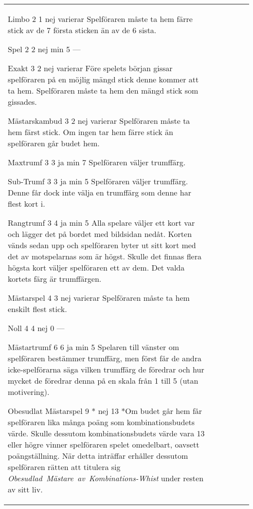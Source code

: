 \begin{table}
\begin{center}
\begin{tabularx}{\textwidth}{
			l
			S[table-number-alignment=center, table-format=1.0]
			S[table-number-alignment=center, table-format=1.0]
			cc|X
		}
				\standardBidItem%
				{Limbo}
				{2}
				{1}
				{nej}
				{varierar}
				{%
					Spelföraren måste ta hem färre stick av de 7 första sticken än av de 6 sista.
				}
				
				\standardBidItem%
				{Spel}
				{2}
				{2}
				{nej}
				{min 5}
				{%
					---
				}

				\standardBidItem%
				{Exakt}
				{3}
				{2}
				{nej}
				{varierar}
				{%
					Före spelets början gissar spelföraren på en möjlig mängd stick denne kommer att ta hem. Spelföraren måste ta hem den mängd stick som gissades.
				}

				\standardBidItem%
				{Mästarskambud}
				{3}
				{2}
				{nej}
				{varierar}
				{%
					Spelföraren måste ta hem färst stick. Om ingen tar hem färre stick än spelföraren går budet hem.
				}

				\standardBidItem%
				{Maxtrumf}
				{3}
				{3}
				{ja}
				{min 7}
				{%
					Spelföraren väljer trumffärg.
				}

				\standardBidItem%
				{Sub-Trumf}
				{3}
				{3}
				{ja}
				{min 5}
				{%
					Spelföraren väljer trumffärg. Denne får dock inte välja en trumffärg som denne har flest kort i.
				}

				\standardBidItem%
				{Rangtrumf}
				{3}
				{4}
				{ja}
				{min 5}
				{%
					Alla spelare väljer ett kort var och lägger det på bordet med bildsidan nedåt. Korten vänds sedan upp och spelföraren byter ut sitt kort med det av motspelarnas som är högst. Skulle det finnas flera högsta kort väljer spelföraren ett av dem. Det valda kortets färg är trumffärgen.
				}

				\standardBidItem%
				{Mästarspel}
				{4}
				{3}
				{nej}
				{varierar}
				{%
					Spelföraren måste ta hem enskilt flest stick.
				}

				\standardBidItem%
				{Noll}
				{4}
				{4}
				{nej}
				{0}
				{%
					---
				}

				\standardBidItem%
				{Mästartrumf}
				{6}
				{6}
				{ja}
				{min 5}
				{%
					Spelaren till vänster om spelföraren bestämmer trumffärg, men först får de andra icke-spelförarna säga vilken trumffärg de föredrar och hur mycket de föredrar denna på en skala från 1 till 5 (utan motivering).
				}

				\standardBidItem%
				{Obesudlat Mästarspel}
				{9}
				{*}
				{nej}
				{13}
				{%
					*Om budet går hem får spelföraren lika många poäng som kombinationsbudets värde. Skulle dessutom kombinationsbudets värde vara 13 eller högre vinner spelföraren spelet omedelbart, oavsett poängställning. När detta inträffar erhåller dessutom spelföraren rätten att titulera sig \emph{Obesudlad~Mästare~av~Kombinations-Whist} under resten av sitt liv.
				}
		\end{tabularx}
	\end{center}
\end{table}
